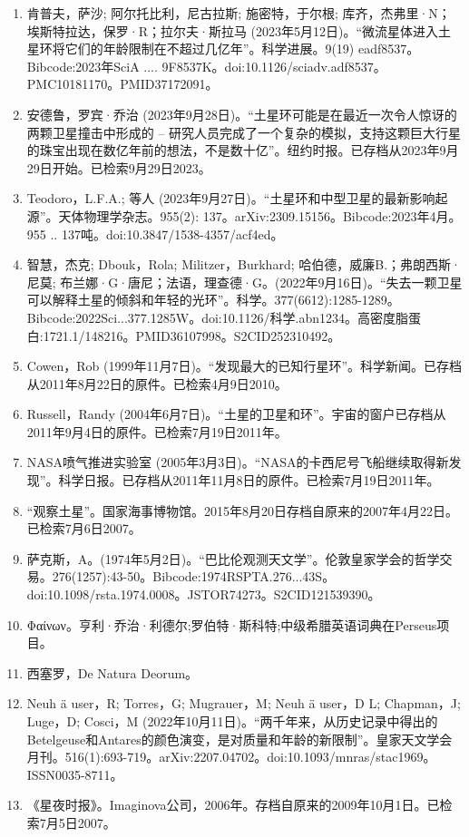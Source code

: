 \begin{enumerate}
\item 肯普夫，萨沙; 阿尔托比利，尼古拉斯; 施密特，于尔根; 库齐，杰弗里·N；埃斯特拉达，保罗·R；拉尔夫·斯拉马 (2023年5月12日)。“微流星体进入土星环将它们的年龄限制在不超过几亿年”。科学进展。9(19) eadf8537。Bibcode:2023年SciA .... 9F8537K。doi:10.1126/sciadv.adf8537。PMC10181170。PMID37172091。  
\item 安德鲁，罗宾·乔治 (2023年9月28日)。“土星环可能是在最近一次令人惊讶的两颗卫星撞击中形成的 -- 研究人员完成了一个复杂的模拟，支持这颗巨大行星的珠宝出现在数亿年前的想法，不是数十亿”。纽约时报。已存档从2023年9月29日开始。已检索9月29日2023。
\item Teodoro，L.F.A.; 等人 (2023年9月27日)。“土星环和中型卫星的最新影响起源”。天体物理学杂志。955(2): 137。arXiv:2309.15156。Bibcode:2023年4月。955 .. 137吨。doi:10.3847/1538-4357/acf4ed。
\item 智慧，杰克; Dbouk，Rola; Militzer，Burkhard; 哈伯德，威廉B.；弗朗西斯·尼莫; 布兰娜·G·唐尼；法语，理查德·G。(2022年9月16日)。“失去一颗卫星可以解释土星的倾斜和年轻的光环”。科学。377(6612):1285-1289。Bibcode:2022Sci...377.1285W。doi:10.1126/科学.abn1234。高密度脂蛋白:1721.1/148216。PMID36107998。S2CID252310492。  
\item Cowen，Rob (1999年11月7日)。“发现最大的已知行星环”。科学新闻。已存档从2011年8月22日的原件。已检索4月9日2010。
\item Russell，Randy (2004年6月7日)。“土星的卫星和环”。宇宙的窗户已存档从2011年9月4日的原件。已检索7月19日2011年。
\item NASA喷气推进实验室 (2005年3月3日)。“NASA的卡西尼号飞船继续取得新发现”。科学日报。已存档从2011年11月8日的原件。已检索7月19日2011年。
\item “观察土星”。国家海事博物馆。2015年8月20日存档自原来的2007年4月22日。已检索7月6日2007。
\item 萨克斯，A。(1974年5月2日)。“巴比伦观测天文学”。伦敦皇家学会的哲学交易。276(1257):43-50。Bibcode:1974RSPTA.276...43S。doi:10.1098/rsta.1974.0008。JSTOR74273。S2CID121539390。  
\item Φαίνων。亨利·乔治·利德尔;罗伯特·斯科特;中级希腊英语词典在Perseus项目。
\item 西塞罗，De Natura Deorum。
\item Neuh ä user，R; Torres，G; Mugrauer，M; Neuh ä user，D L; Chapman，J; Luge，D; Cosci，M (2022年10月11日)。“两千年来，从历史记录中得出的Betelgeuse和Antares的颜色演变，是对质量和年龄的新限制”。皇家天文学会月刊。516(1):693-719。arXiv:2207.04702。doi:10.1093/mnras/stac1969。ISSN0035-8711。 
\item 《星夜时报》。Imaginova公司，2006年。存档自原来的2009年10月1日。已检索7月5日2007。

\end{enumerate}
